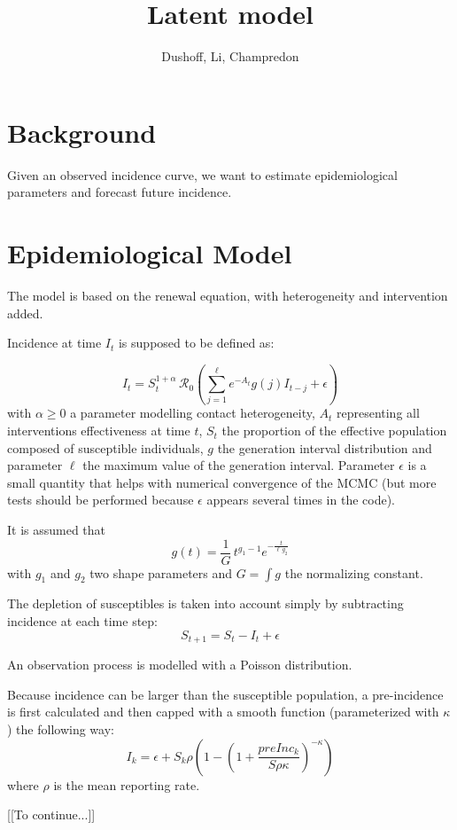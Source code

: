 \documentclass[12pt]{article}
\title{Latent model}
\author{Dushoff, Li, Champredon}
\newcommand{\Ro}{\mathcal{R}_0}
\begin{document}
\maketitle



\section{Background}

Given an observed incidence curve, we want to estimate epidemiological parameters and forecast future incidence.

\section{Epidemiological Model}

The model is based on the renewal equation, with heterogeneity and intervention added.

Incidence at time $I_t$ is supposed to be defined as:

\begin{equation}
I_t = S_t^{1+\alpha}\, \Ro \left( \sum_{j=1}^{\ell} e^{-A_t} g(j) I_{t-j}   + \epsilon \right)
\label{eq:renewal}
\end{equation}
with $\alpha\geq 0$ a parameter modelling contact heterogeneity, $A_t$ representing all interventions effectiveness at time $t$, $S_t$ the proportion of the effective population composed of susceptible individuals, $g$ the generation interval distribution and parameter $\ell$ the maximum value of the generation interval. Parameter $\epsilon$ is a small quantity that helps with numerical convergence of the MCMC (but more tests should be performed because $\epsilon$ appears several times in the code).

It is assumed that 
$$ g(t) = \frac{1}{G}\, t^{g_1 -1} e^{-\frac{t}{\ell\, g_2}}$$
with $g_1$ and $g_2$ two shape parameters and $G=\int g$ the normalizing constant.

The depletion of susceptibles is taken into account simply by subtracting incidence at each time step:
\begin{equation}
S_{t+1} = S_t - I_t + \epsilon
\end{equation}

An observation process is modelled with a Poisson distribution.

Because incidence can be larger than the susceptible population, a pre-incidence is first calculated and then capped with a smooth function (parameterized with $\kappa$) the following way:
$$I_k = \epsilon + S_k \rho (1-(1+\frac{preInc_k}{S\rho\kappa})^{-\kappa})$$
where $\rho$ is the mean reporting rate.

[[To continue...]]
\end{document}
